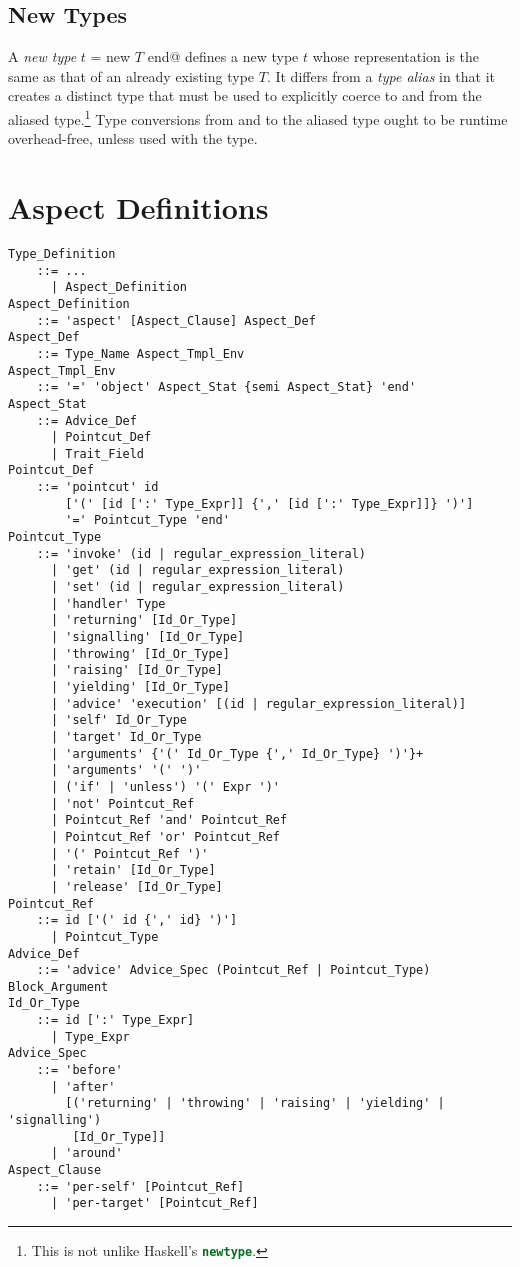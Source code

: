 \subsection{New Types}
A {\em new type} \lstinline@type $t$ = new $T$ end@ defines a new type $t$ whose representation is the same as that of an already existing type $T$. It differs from a {\em type alias} in that it creates a distinct type that must be used to explicitly coerce to and from the aliased type.\footnote{This is not unlike Haskell's \lstinline[language=Haskell]@newtype@.} Type conversions from and to the aliased type ought to be runtime overhead-free, unless used with the  type.






\section{Aspect Definitions}
\label{sec:aspects}

\grammar\begin{lstlisting}
Type_Definition 
    ::= ...
      | Aspect_Definition
Aspect_Definition 
    ::= 'aspect' [Aspect_Clause] Aspect_Def
Aspect_Def
    ::= Type_Name Aspect_Tmpl_Env
Aspect_Tmpl_Env 
    ::= '=' 'object' Aspect_Stat {semi Aspect_Stat} 'end'
Aspect_Stat 
    ::= Advice_Def
      | Pointcut_Def
      | Trait_Field
Pointcut_Def 
    ::= 'pointcut' id
        ['(' [id [':' Type_Expr]] {',' [id [':' Type_Expr]]} ')']
        '=' Pointcut_Type 'end'
Pointcut_Type 
    ::= 'invoke' (id | regular_expression_literal)
      | 'get' (id | regular_expression_literal)
      | 'set' (id | regular_expression_literal)
      | 'handler' Type
      | 'returning' [Id_Or_Type]
      | 'signalling' [Id_Or_Type]
      | 'throwing' [Id_Or_Type]
      | 'raising' [Id_Or_Type]
      | 'yielding' [Id_Or_Type]
      | 'advice' 'execution' [(id | regular_expression_literal)]
      | 'self' Id_Or_Type
      | 'target' Id_Or_Type
      | 'arguments' {'(' Id_Or_Type {',' Id_Or_Type} ')'}+
      | 'arguments' '(' ')'
      | ('if' | 'unless') '(' Expr ')'
      | 'not' Pointcut_Ref
      | Pointcut_Ref 'and' Pointcut_Ref
      | Pointcut_Ref 'or' Pointcut_Ref
      | '(' Pointcut_Ref ')'
      | 'retain' [Id_Or_Type]
      | 'release' [Id_Or_Type]
Pointcut_Ref 
    ::= id ['(' id {',' id} ')'] 
      | Pointcut_Type
Advice_Def 
    ::= 'advice' Advice_Spec (Pointcut_Ref | Pointcut_Type) Block_Argument
Id_Or_Type
    ::= id [':' Type_Expr] 
      | Type_Expr
Advice_Spec 
    ::= 'before' 
      | 'after' 
        [('returning' | 'throwing' | 'raising' | 'yielding' | 'signalling') 
         [Id_Or_Type]]
      | 'around'
Aspect_Clause
    ::= 'per-self' [Pointcut_Ref] 
      | 'per-target' [Pointcut_Ref] 
\end{lstlisting}

